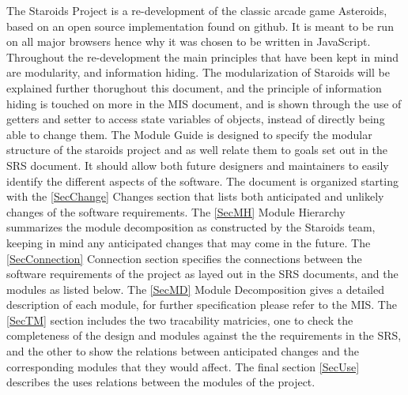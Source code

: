 \documentclass[12pt, titlepage]{article}
\begin{document}
The Staroids Project is a re-development of the classic arcade game Asteroids, based on an open source implementation found on github. It is meant to be run on all major browsers hence why it was chosen to be written in JavaScript. Throughout the re-development the main principles that have been kept in mind are modularity, and information hiding. The modularization of Staroids will be explained further thorughout this document, and the principle of information hiding is touched on more in the MIS document, and is shown through the use of getters and setter to access state variables of objects, instead of directly being able to change them. The Module Guide is designed to specify the modular structure of the staroids project and as well relate them to goals set out in the SRS document. It should allow both future designers and maintainers to easily identify the different aspects of the software. The document is organized starting with the \ref{SecChange} Changes section that lists both anticipated and unlikely changes of the software requirements. The \ref{SecMH} Module Hierarchy summarizes the module decomposition as constructed by the Staroids team, keeping in mind any anticipated changes that may come in the future. The \ref{SecConnection} Connection section specifies the connections between the software requirements of the project as layed out in the SRS documents, and the modules as listed below. The \ref{SecMD} Module Decomposition gives a detailed description of each module, for further specification please refer to the MIS. The \ref{SecTM} section includes the two tracability matricies, one to check the completeness of the design and modules against the the requirements in the SRS, and the other to show the relations between anticipated changes and the corresponding modules that they would affect. The final section \ref{SecUse} describes the uses relations between the modules of the project.




\end{document}

